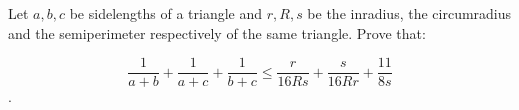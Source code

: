 Let $a,b,c$ be sidelengths of a triangle and $r,R,s$ be the inradius, the circumradius and the semiperimeter respectively of the same triangle. Prove that:

$$\frac{1}{a + b} + \frac{1}{a + c} + \frac{1}{b + c} \leq \frac{r}{16Rs}+\frac{s}{16Rr} + \frac{11}{8s}$$.
